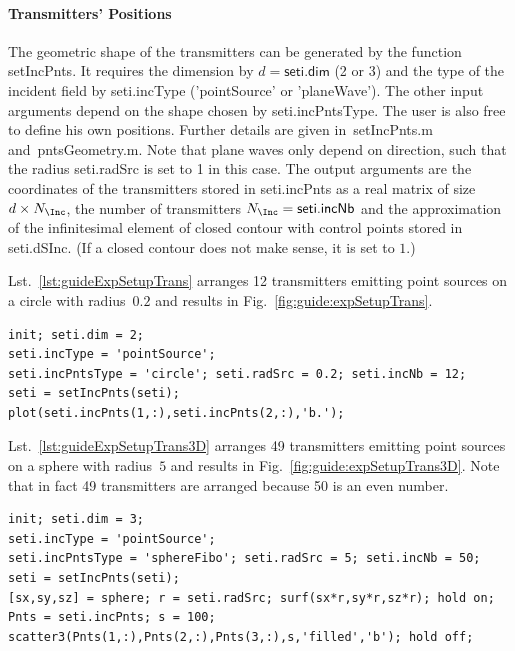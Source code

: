 \documentclass[a4paper]{article}
\begin{document}
\paragraph{Transmitters' Positions} The geometric shape of the transmitters can be generated by the function \textsf{setIncPnts}. 
%
It requires the dimension by $d = \textsf{seti.dim}$ (2 or 3) and the type of the incident field by \textsf{seti.incType} (\textsf{'pointSource'} or \textsf{'planeWave'}). The other input arguments depend on the shape chosen by \textsf{seti.incPntsType}. The user is also free to define his own positions. Further details are given in~\textsf{setIncPnts.m} and~\textsf{pntsGeometry.m}.
%
Note that plane waves only depend on direction, such that the radius \textsf{seti.radSrc} is set to 1 in this case.
%
The output arguments are the coordinates of the transmitters stored in \textsf{seti.incPnts} as a real matrix of size $d \times N_\Inc$, the number of transmitters $N_\Inc = \textsf{seti.incNb}$ and the approximation of the infinitesimal element of closed contour with control points stored in \textsf{seti.dSInc}. (If a closed contour does not make sense, it is set to $1$.)

Lst.~\ref{lst:guideExpSetupTrans} arranges 12 transmitters emitting point sources on a circle with radius~$0.2$ and results in Fig.~\ref{fig:guide:expSetupTrans}.
\begin{lstlisting}[caption={Arrange transmitters on a circle (\emph{source code}: \textsf{guides/guideExpSetupTrans.m}).},label=lst:guideExpSetupTrans]
init; seti.dim = 2;
seti.incType = 'pointSource';
seti.incPntsType = 'circle'; seti.radSrc = 0.2; seti.incNb = 12;
seti = setIncPnts(seti);
plot(seti.incPnts(1,:),seti.incPnts(2,:),'b.');
\end{lstlisting}

Lst.~\ref{lst:guideExpSetupTrans3D} arranges 49 transmitters emitting point sources on a sphere with radius~$5$ and results in Fig.~\ref{fig:guide:expSetupTrans3D}. Note that in fact 49 transmitters are arranged because 50 is an even number. 
\begin{lstlisting}[caption={Arrange transmitters on a sphere (\emph{source code}: \textsf{guides/guideExpSetupTrans3D.m}).},label=lst:guideExpSetupTrans3D]
init; seti.dim = 3;
seti.incType = 'pointSource';
seti.incPntsType = 'sphereFibo'; seti.radSrc = 5; seti.incNb = 50;
seti = setIncPnts(seti);
[sx,sy,sz] = sphere; r = seti.radSrc; surf(sx*r,sy*r,sz*r); hold on;
Pnts = seti.incPnts; s = 100; scatter3(Pnts(1,:),Pnts(2,:),Pnts(3,:),s,'filled','b'); hold off;
\end{lstlisting}
\end{document}
